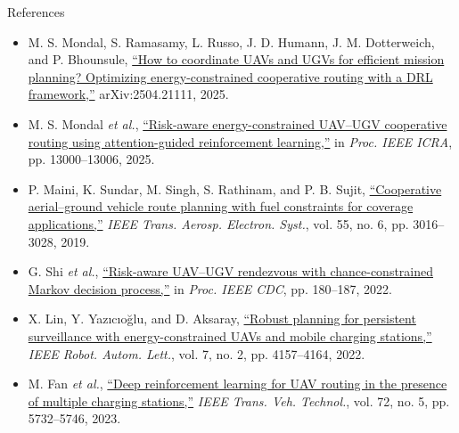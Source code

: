 \documentclass[aspectratio=169,10pt]{beamer}
\begin{document}
\begin{frame}{References}
\scriptsize
\begin{itemize}\setlength{\itemsep}{1.5mm}
  \item[{[1]}] M. S. Mondal, S. Ramasamy, L. Russo, J. D. Humann, J. M. Dotterweich, and P. Bhounsule,
  \href{https://arxiv.org/abs/2504.21111}{``How to coordinate UAVs and UGVs for efficient mission planning? Optimizing energy-constrained cooperative routing with a DRL framework,''} arXiv:2504.21111, 2025.

  \item[{[2]}] M. S. Mondal \emph{et al.}, \href{https://doi.org/10.1109/ICRA55743.2025.11128262}{``Risk-aware energy-constrained UAV--UGV cooperative routing using attention-guided reinforcement learning,''} in \emph{Proc. IEEE ICRA}, pp. 13000--13006, 2025.

  \item[{[3]}] P. Maini, K. Sundar, M. Singh, S. Rathinam, and P. B. Sujit, \href{https://doi.org/10.1109/TAES.2019.2917578}{``Cooperative aerial--ground vehicle route planning with fuel constraints for coverage applications,''} \emph{IEEE Trans. Aerosp. Electron. Syst.}, vol. 55, no. 6, pp. 3016--3028, 2019.

  \item[{[4]}] G. Shi \emph{et al.}, \href{https://doi.org/10.1109/CDC51059.2022.9993358}{``Risk-aware UAV--UGV rendezvous with chance-constrained Markov decision process,''} in \emph{Proc. IEEE CDC}, pp. 180--187, 2022.

  \item[{[5]}] X. Lin, Y. Yaz{\i}c{\i}o\u{g}lu, and D. Aksaray, \href{https://doi.org/10.1109/LRA.2022.3146938}{``Robust planning for persistent surveillance with energy-constrained UAVs and mobile charging stations,''} \emph{IEEE Robot. Autom. Lett.}, vol. 7, no. 2, pp. 4157--4164, 2022.

  \item[{[6]}] M. Fan \emph{et al.}, \href{https://doi.org/10.1109/TVT.2022.3232607}{``Deep reinforcement learning for UAV routing in the presence of multiple charging stations,''} \emph{IEEE Trans. Veh. Technol.}, vol. 72, no. 5, pp. 5732--5746, 2023.
\end{itemize}
\end{frame}
\end{document}

